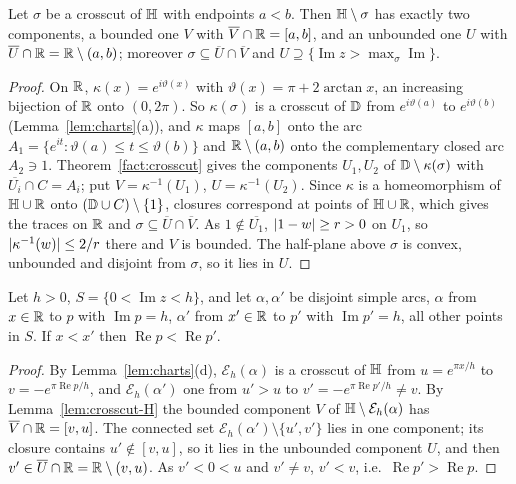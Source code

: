 \begin{lemma}\label{lem:crosscut-H}
Let $\sigma$ be a crosscut of $\mathbb{H}$ with endpoints $a<b$. Then $\mathbb{H}\setminus\sigma$ has exactly two
components, a bounded one $V$ with $\overline V\cap\mathbb{R}=[a,b]$, and an unbounded one $U$ with
$\overline U\cap\mathbb{R}=\mathbb{R}\setminus(a,b)$; moreover $\sigma\subseteq\overline U\cap\overline V$ and
$U\supseteq\{\operatorname{Im}z>\max_\sigma\operatorname{Im}\}$.
\end{lemma}
\begin{proof}
On $\mathbb{R}$, $\kappa(x)=e^{i\vartheta(x)}$ with $\vartheta(x)=\pi+2\arctan x$, an increasing bijection of $\mathbb{R}$ onto
$(0,2\pi)$. So $\kappa(\sigma)$ is a crosscut of $\mathbb{D}$ from $e^{i\vartheta(a)}$ to $e^{i\vartheta(b)}$
(Lemma~\ref{lem:charts}(a)), and $\kappa$ maps $[a,b]$ onto the arc $A_1=\{e^{it}:\vartheta(a)\le t\le\vartheta(b)\}$
and $\mathbb{R}\setminus(a,b)$ onto the complementary closed arc $A_2\ni1$. Theorem~\ref{fact:crosscut} gives the
components $U_1,U_2$ of $\mathbb{D}\setminus\kappa(\sigma)$ with $\overline{U_i}\cap C=A_i$; put $V=\kappa^{-1}(U_1)$,
$U=\kappa^{-1}(U_2)$. Since $\kappa$ is a homeomorphism of $\mathbb{H}\cup\mathbb{R}$ onto $(\mathbb{D}\cup C)\setminus\{1\}$, closures
correspond at points of $\mathbb{H}\cup\mathbb{R}$, which gives the traces on $\mathbb{R}$ and $\sigma\subseteq\overline U\cap\overline V$.
As $1\notin\overline{U_1}$, $\lvert 1-w\rvert\ge r>0$ on $U_1$, so $\lvert \kappa^{-1}(w)\rvert\le2/r$ there and $V$ is bounded.
The half-plane above $\sigma$ is convex, unbounded and disjoint from $\sigma$, so it lies in $U$.
\end{proof}

\begin{lemma}\label{lem:strip}
Let $h>0$, $S=\{0<\operatorname{Im}z<h\}$, and let $\alpha,\alpha'$ be disjoint simple arcs, $\alpha$ from
$x\in\mathbb{R}$ to $p$ with $\operatorname{Im}p=h$, $\alpha'$ from $x'\in\mathbb{R}$ to $p'$ with
$\operatorname{Im}p'=h$, all other points in $S$. If $x<x'$ then $\operatorname{Re}p<\operatorname{Re}p'$.
\end{lemma}
\begin{proof}
By Lemma~\ref{lem:charts}(d), $\mathcal E_h(\alpha)$ is a crosscut of $\mathbb{H}$ from $u=e^{\pi x/h}$ to
$v=-e^{\pi\operatorname{Re}p/h}$, and $\mathcal E_h(\alpha')$ one from $u'>u$ to
$v'=-e^{\pi\operatorname{Re}p'/h}\ne v$. By Lemma~\ref{lem:crosscut-H} the bounded component $V$ of
$\mathbb{H}\setminus\mathcal E_h(\alpha)$ has $\overline V\cap\mathbb{R}=[v,u]$. The connected set
$\mathcal E_h(\alpha')\setminus\{u',v'\}$ lies in one component; its closure contains $u'\notin[v,u]$, so
it lies in the unbounded component $U$, and then $v'\in\overline U\cap\mathbb{R}=\mathbb{R}\setminus(v,u)$. As $v'<0<u$
and $v'\ne v$, $v'<v$, i.e.\ $\operatorname{Re}p'>\operatorname{Re}p$.
\end{proof}

